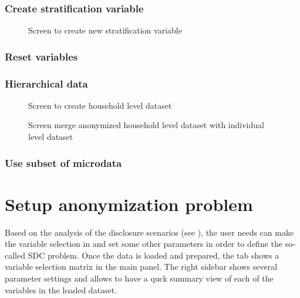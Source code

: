 \documentclass[letterpaper,10pt,english]{sphinxmanual}
\begin{document}
\subsection{Create stratification variable}
\label{\detokenize{loadprepdata:create-stratification-variable}}
\begin{figure}[htbp]
\centering
\capstart

\noindent{}
\caption{Screen to create new stratification variable}\label{\detokenize{loadprepdata:fig58}}\label{\detokenize{loadprepdata:id8}}\end{figure}


\subsection{Reset variables}
\label{\detokenize{loadprepdata:reset-variables}}

\subsection{Hierarchical data}
\label{\detokenize{loadprepdata:hierarchical-data}}
\begin{figure}[htbp]
\centering
\capstart

\noindent{}
\caption{Screen to create household level dataset}\label{\detokenize{loadprepdata:fig59}}\label{\detokenize{loadprepdata:id9}}\end{figure}

\begin{figure}[htbp]
\centering
\capstart

\noindent{}
\caption{Screen merge anonymized household level dataset with individual level dataset}\label{\detokenize{loadprepdata:fig510}}\label{\detokenize{loadprepdata:id10}}\end{figure}


\subsection{Use subset of microdata}
\label{\detokenize{loadprepdata:use-subset-of-microdata}}

\chapter{Setup anonymization problem}
\label{\detokenize{setup::doc}}\label{\detokenize{setup:setup-anonymization-problem}}
Based on the analysis of the disclosure scenarios (see ), the user needs can make the variable
selection in  and set some other parameters in order to define the
so-called SDC problem. Once the data is loaded and prepared,
the tab  shows a variable selection matrix in the main panel. The right sidebar
shows several parameter settings and allows to have a quck summary view of each of the variables
in the loaded dataset.
\end{document}
